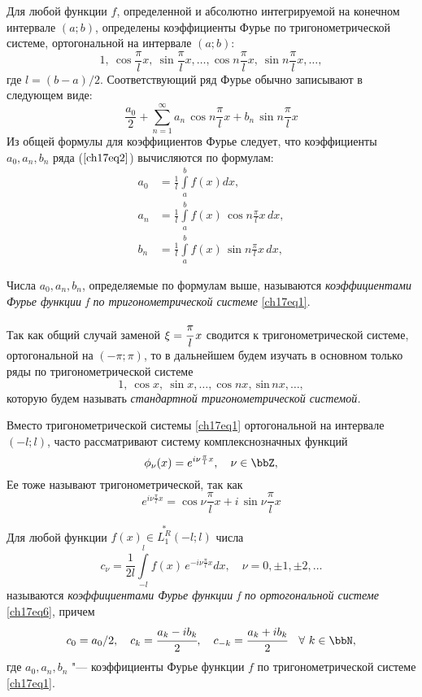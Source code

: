 Для любой функции $f$, определенной и абсолютно интегрируемой на конечном интервале $(a;b)$, определены коэффициенты Фурье по тригонометрической системе, ортогональной на интервале $(a;b)$:
\begin{equation} \label{ch17eq1}
1,\ \cos \frac{\pi}{l}x,\ \sin \frac{\pi}{l}x,\ldots,\cos n\frac{\pi}{l}x,\ \sin n\frac{\pi}{l}x,\ldots,
\end{equation}
где $l = (b - a)/2$. Соответствующий ряд Фурье обычно записывают в следующем виде:
\begin{equation} \label{ch17eq2}
\frac{a_0}{2} + \sum_{n = 1}^{\infty} a_{n}\,\cos n\frac{\pi}{l}x + b_{n}\, \sin n\frac{\pi}{l}x
\end{equation}
Из общей формулы для коэффициентов Фурье следует, что коэффициенты $a_0, a_n, b_n$ ряда ($\ref{ch17eq2}$) вычисляются по формулам:
\begin{align} \label{ch17eq3}
a_0 &= \frac{1}{l} \int\limits_{a}^{b} f(x)dx,\\
a_n &= \frac{1}{l} \int\limits_{a}^{b} f(x)\,\cos n\frac{\pi}{l}x\, dx,\\
b_n &= \frac{1}{l} \int\limits_{a}^{b} f(x)\,\sin n\frac{\pi}{l}x\, dx,
\end{align}

\begin{defn}
Числа $a_0, a_n, b_n$, определяемые по формулам выше, называются \textit{коэффициентами Фурье функции f по тригонометрической системе} \eqref{ch17eq1}.
\end{defn}

Так как общий случай заменой $\xi = \cfrac{\pi}{l}\, x$ сводится к тригонометрической системе, ортогональной на $(-\pi;\pi)$, то в дальнейшем будем изучать в основном только ряды по тригонометрической системе
$$
1,\ \cos x,\ \sin x,\ldots,\cos nx,\ \text{sin}\, nx,\ldots,
$$
которую будем называть \textit{стандартной тригонометрической системой.}

Вместо тригонометрической системы \eqref{ch17eq1} ортогональной на интервале $(-l;l)$, часто рассматривают систему комплекснозначных функций
\begin{equation} \label{ch17eq6}
\phi_{\nu}(x) = e^{i\nu\frac{\pi}{l}x},\quad \nu \in \bbZ,
\end{equation}
Ее тоже называют тригонометрической, так как
$$
e^{i\nu\frac{\pi}{l}x} = \cos \nu\frac{\pi}{l}x + i\, \sin \nu\frac{\pi}{l}x
$$
\begin{defn}
Для любой функции $f(x) \in \overset{*}{L^{R}_1}(-l;l)$ числа
\begin{equation}
c_{\nu} = \frac{1}{2l} \int\limits_{-l}^{l} f(x)\, e^{-i\nu\frac{\pi}{l}x}dx,\quad \nu = 0,\pm 1, \pm 2,\ldots
\end{equation}
называются \textit{коэффициентами Фурье функции f по ортогональной системе} \eqref{ch17eq6}, причем
\begin{equation}
c_0 = a_0/2, \quad c_{k} = \cfrac{a_k - ib_k}{2}, \quad c_{-k} = \cfrac{a_k + ib_k}{2} \quad \forall\ k \in \bbN,
\end{equation}
где $a_0, a_n, b_n$ "--- коэффициенты Фурье функции $f$ по тригонометрической системе \eqref{ch17eq1}.
\end{defn}

